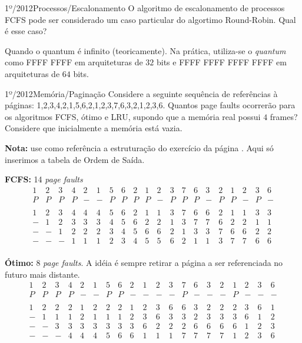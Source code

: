 \begin{exercicio}
  {1º/2012}{Processos/Escalonamento}
  {O algoritmo de escalonamento de processos FCFS pode ser considerado um caso particular do algortimo Round-Robin. Qual é esse caso?}

  Quando o quantum é infinito (teoricamente). Na prática, utiliza-se o \textit{quantum} como FFFF FFFF em arquiteturas de $32$ bits e FFFF FFFF FFFF FFFF em arquiteturas de $64$ bits.
\end{exercicio}

\begin{exercicio}
  {1º/2012}{Memória/Paginação}
  {Considere a seguinte sequência de referências à páginas:
  1,2,3,4,2,1,5,6,2,1,2,3,7,6,3,2,1,2,3,6. \newline
  Quantos page faults ocorrerão para os algoritmos FCFS, ótimo e LRU, supondo que a memória real possui $4$ frames? Considere que inicialmente a memória está vazia.}

  \textbf{Nota:} use como referência a estruturação do exercício da página \pageref{ex:pagination-1}. Aqui só inserimos a tabela de Ordem de Saída.

  \textbf{FCFS:} 14 \textit{page faults} \\
  \[
  \begin{array}{cccccccccccccccccccc}
1 & 2 & 3 & 4 & 2 & 1 & 5 & 6 & 2 & 1 & 2 & 3 & 7 & 6 & 3 & 2 & 1 & 2 & 3 & 6 \\ \hline
P & P & P & P & - & - & P & P & P & P & - & P & P & P & - & P & P & - & P & - \\
\\
1 & 2 & 3 & 4 & 4 & 4 & 5 & 6 & 2 & 1 & 1 & 3 & 7 & 6 & 6 & 2 & 1 & 1 & 3 & 3 \\
- & 1 & 2 & 3 & 3 & 3 & 4 & 5 & 6 & 2 & 2 & 1 & 3 & 7 & 7 & 6 & 2 & 2 & 1 & 1 \\
- & - & 1 & 2 & 2 & 2 & 3 & 4 & 5 & 6 & 6 & 2 & 1 & 3 & 3 & 7 & 6 & 6 & 2 & 2 \\
- & - & - & 1 & 1 & 1 & 2 & 3 & 4 & 5 & 5 & 6 & 2 & 1 & 1 & 3 & 7 & 7 & 6 & 6 \\
  \end{array}
  \]

  \textbf{Ótimo:} 8 \textit{page faults}. A idéia é sempre retirar a página a ser referenciada no futuro mais distante. \\
  \[
  \begin{array}{cccccccccccccccccccc}
1 & 2 & 3 & 4 & 2 & 1 & 5 & 6 & 2 & 1 & 2 & 3 & 7 & 6 & 3 & 2 & 1 & 2 & 3 & 6 \\ \hline
P & P & P & P & - & - & P & P & - & - & - & - & P & - & - & - & P & - & - & - \\
\\
1 & 2 & 2 & 2 & 1 & 2 & 2 & 2 & 1 & 2 & 3 & 6 & 6 & 3 & 2 & 2 & 2 & 3 & 6 & 1 \\
- & 1 & 1 & 1 & 2 & 1 & 1 & 1 & 2 & 3 & 6 & 3 & 3 & 2 & 3 & 3 & 3 & 6 & 1 & 2 \\
- & - & 3 & 3 & 3 & 3 & 3 & 3 & 3 & 6 & 2 & 2 & 2 & 6 & 6 & 6 & 6 & 1 & 2 & 3 \\
- & - & - & 4 & 4 & 4 & 5 & 6 & 6 & 1 & 1 & 1 & 7 & 7 & 7 & 7 & 1 & 2 & 3 & 6 \\
  \end{array}
  \]


\end{exercicio}
